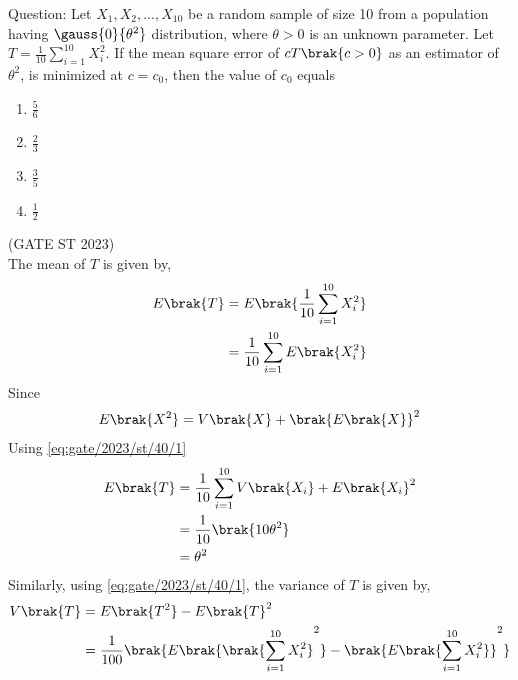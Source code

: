 \documentclass[journal,12pt,onecolumn]{IEEEtran}
\theoremstyle{remark}
\begin{document}
%
Question:
Let $X_1, X_2, ..., X_{10}$ be a random sample of size 10 from a population having $\gauss{0}{\theta^2}$ distribution, where $\theta > 0$ is an unknown parameter.
Let $T = \frac{1}{10}\sum^{10}_{i=1}{X_i^2}$. If the mean square error of $cT \brak{c > 0}$ as an estimator of $\theta^2$, is minimized at $c = c_0$, then the value of $c_0$ equals
\begin{enumerate}[label =(\roman*)]
	\item $\frac{5}{6}$ \vspace{2pt}
	\item $\frac{2}{3}$ \vspace{2pt}
	\item $\frac{3}{5}$ \vspace{2pt}
	\item $\frac{1}{2}$ \vspace{2pt}
\end{enumerate}
\hfill{(GATE ST 2023)}
\\
\fi
\solution
The mean of $T$ is given by,
\begin{align}
	E\brak{T} &= E\brak{\frac{1}{10}\sum^{10}_{i=1}{X_i^2}}\\
	&= \frac{1}{10}\sum^{10}_{i=1}{E\brak{X_i^2}}
\end{align}
Since
\begin{align}
	E\brak{X^2} = V\brak{X} + \brak{E\brak{X}}^2 \label{eq:gate/2023/st/40/1}
\end{align}
Using \eqref{eq:gate/2023/st/40/1}
\begin{align}
	E\brak{T} &= \frac{1}{10}\sum^{10}_{i=1}{V\brak{X_i} + E\brak{X_i}^2}\\
	&= \frac{1}{10}\brak{10\theta^2}\\
	&= \theta^2
\end{align}
Similarly, using \eqref{eq:gate/2023/st/40/1}, the variance of $T$ is given by,
\begin{align}
	V\brak{T} &= E\brak{T^2} - E\brak{T}^2\\
	&= \frac{1}{100}\brak{E\brak{\brak{\sum^{10}_{i=1}{X_i^2}}^2} - \brak{E\brak{\sum^{10}_{i=1}{X_i^2}}}^2}
\end{align}
\end{document}
